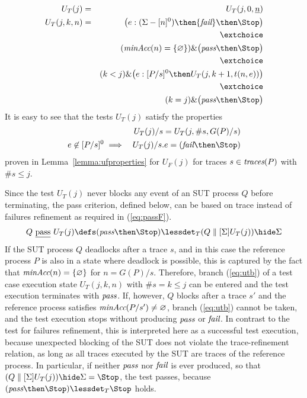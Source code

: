 \documentclass[3p,times]{elsarticle}
\newcommand{\trc}{\text{\it traces}}
\newcommand{\epass}{{\text{\it pass}}}
\newcommand{\efail}{{\text{\it fail}}}
\newcommand{\pass}{\underline{\text{pass}}}
\newcommand{\ii}[1]{\underline{#1}}
\newcommand{\minaccs}{\text{\it minAcc}}
\begin{document}
\begin{eqnarray}
U_T(j) & = & U_T(j,0,\ii n)
\label{eq:utjstart}
\\
U_T(j,k,n) & = & \big(  e:(\Sigma - [n]^0)   \then \efail\then \Stop \big)
\label{eq:uta}
\\ & & \extchoice \nonumber
\\ & & (\minaccs(n) = \{ \varnothing \})   \&   \big( \epass \then \Stop \big)
\label{eq:utb}
\\ & & \extchoice \nonumber
\\ & & (k < j) \& \big( e:[P/s]^0   \then U_T(j,k+1,t(n,e)) \big)
\label{eq:utc}
\\ & & \extchoice \nonumber
\\ & & (k = j) \& \big( \epass\then \Stop  \big)
\label{eq:utd}
\end{eqnarray}
%
It is easy to see that the tests $U_T(j)$ satisfy the properties
\begin{eqnarray}
\label{eq:ifpaT}
  &  & U_T(j)/s = U_T(j,\#s,G(P)/s)
\\
\label{eq:ifpbT}
e\not\in [P/s]^0 & \implies & U_T(j)/s.e = (\efail\then\Stop)
\end{eqnarray}
proven in Lemma~\ref{lemma:ufproperties} for $U_F(j)$ for traces
$s\in\trc(P)$ with $\#s \le j$.


Since the test $U_T(j)$ never blocks any event of an SUT process $Q$ before
terminating, the pass criterion, defined below, can be based on
trace instead of failures refinement as required in (\ref{eq:passF}).
%
\begin{equation}
\label{eq:passT}
Q\ \pass\ U_T(j) \defs (\epass\then\Stop) \lessdet_T (Q\parallel[\Sigma] U_T(j)) \hide \Sigma
\end{equation}
%
If the SUT process $Q$ deadlocks after a trace $s$, and in this case the
reference process $P$ is also in a state where deadlock is possible, this is
captured by the fact that $\minaccs(n) = \{ \varnothing\}$ for $n = G(P)/s$.
Therefore, branch (\ref{eq:utb}) of a test case execution state $U_T(j,k,n)$
with $\#s = k \le j$   can be entered and the  test execution terminates with
$\epass$. If, however, $Q$ blocks after a trace $s'$ and the reference
process satisfies $\minaccs(P/s') \neq\varnothing$, branch (\ref{eq:utb})
cannot be taken, and the test execution stops without producing $\epass$ or
$\efail$. In contrast to the test for failures refinement, this is
interpreted here as a successful test execution, because unexpected blocking
of the SUT does not violate the trace-refinement relation, as long as all
traces executed by the SUT are traces of the reference process. In
particular, if neither $\epass$ nor $\efail$ is ever produced, so that
$(Q\parallel[\Sigma] U_T(j)) \hide \Sigma = \Stop$, the test passes, because
$(\epass\then\Stop) \lessdet_T \Stop$ holds.
\end{document}
